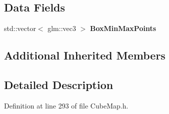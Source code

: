 \subsection*{Data Fields}
\begin{DoxyCompactItemize}
\item 
std\+::vector$<$ glm\+::vec3 $>$ {\bfseries Box\+Min\+Max\+Points}\hypertarget{class_p_c_c_b_a0a2a728f7f8b8de6d4f7629e388b9dfa}{}\label{class_p_c_c_b_a0a2a728f7f8b8de6d4f7629e388b9dfa}

\end{DoxyCompactItemize}
\subsection*{Additional Inherited Members}


\subsection{Detailed Description}


Definition at line 293 of file Cube\+Map.\+h.

